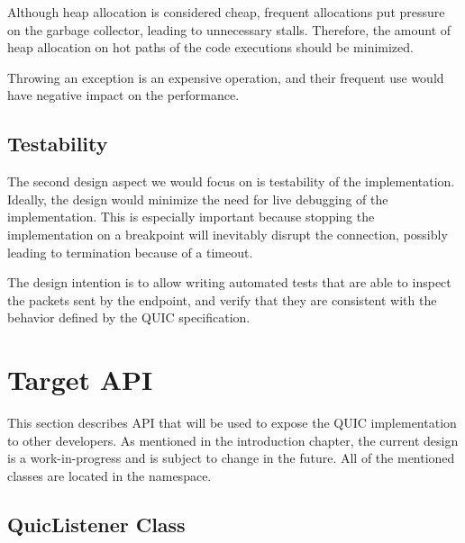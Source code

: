 \begin{itemize}

     Although heap allocation is considered cheap, frequent
    allocations put pressure on the \dotnet{} garbage collector, leading to unnecessary stalls.
    Therefore, the amount of heap allocation on hot paths of the code executions should be
    minimized.

     Throwing an exception is an expensive operation, and
    their frequent use would have negative impact on the performance.

\end{itemize}

\subsection{Testability}

The second design aspect we would focus on is testability of the implementation. Ideally, the design
would minimize the need for live debugging of the implementation. This is especially important
because stopping the implementation on a breakpoint will inevitably disrupt the connection, possibly
leading to termination because of a timeout.

The design intention is to allow writing automated tests that are able to inspect the packets sent
by the endpoint, and verify that they are consistent with the behavior defined by the QUIC
specification.

\section{Target \dotnet{} API}


This section describes API that will be used to expose the QUIC implementation to other developers.
As mentioned in the introduction chapter, the current design is a work-in-progress and is subject to
change in the future. All of the mentioned classes are located in the 
namespace.

\subsection{QuicListener Class}


